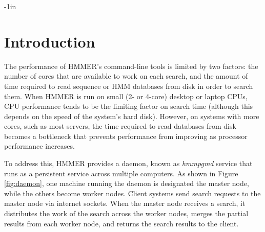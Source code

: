 \documentclass[notoc,justified]{tufte-book}    %
\begin{document}
\setcounter{tocdepth}{2}             %

\maketitle



\begin{adjustwidth}{}{-1in}          %
\tableofcontents                     
\end{adjustwidth}


\chapter{Introduction}

The performance of HMMER's command-line tools is limited by two factors: the number of cores that are available to work on each search, and the amount of time required to read sequence or HMM databases from disk in order to search them.  When HMMER is run on small (2- or 4-core) desktop or laptop CPUs, CPU performance tends to be the limiting factor on search time (although this depends on the speed of the system's hard disk).  However, on systems with more cores, such as most servers, the time required to read databases from disk becomes a bottleneck that prevents performance from improving as processor performance increases.

To address this, HMMER provides a  daemon, known as {\em hmmpgmd} service that runs as a persistent service across multiple computers.  As shown in Figure \ref{fig:daemon}, one machine running the daemon is designated the master node, while the others become worker nodes.  Client systems send search requests to the master node via internet sockets.  When the master node receives a search, it distributes the work of the search across the worker nodes, merges the partial results from each worker node, and returns the search results to the client.
\end{document}
